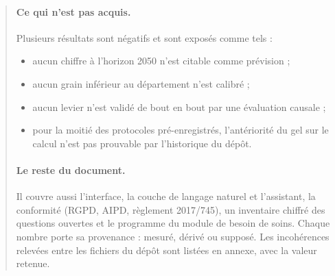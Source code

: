 \begin{abstract}
\paragraph{Ce qui n'est pas acquis.} Plusieurs résultats sont négatifs et sont exposés comme tels :
\begin{itemize}
\item aucun chiffre à l'horizon 2050 n'est citable comme prévision ;
\item aucun grain inférieur au département n'est calibré ;
\item aucun levier n'est validé de bout en bout par une évaluation causale ;
\item pour la moitié des protocoles pré-enregistrés, l'antériorité du gel sur le calcul n'est pas prouvable par
  l'historique du dépôt.
\end{itemize}

\paragraph{Le reste du document.} Il couvre aussi l'interface, la couche de langage naturel et l'assistant, la
conformité (RGPD, AIPD, règlement 2017/745), un inventaire chiffré des questions ouvertes et le programme du
module de besoin de soins. Chaque nombre porte sa provenance : mesuré\mesure, dérivé\derive{} ou
supposé\suppose. Les incohérences relevées entre les fichiers du dépôt sont listées en annexe, avec la valeur
retenue.
\end{abstract}
